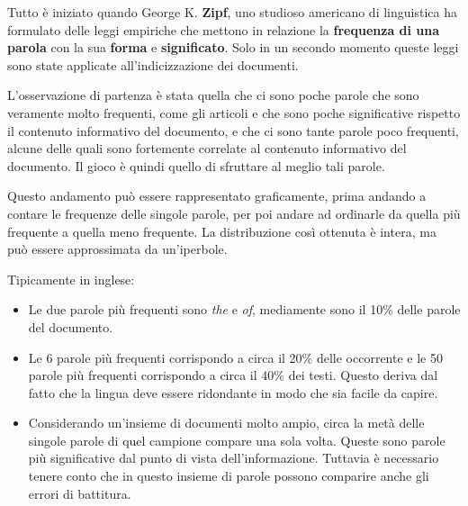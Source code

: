 


Tutto è iniziato quando George K. \textbf{Zipf}, uno studioso americano di linguistica ha formulato delle leggi empiriche che mettono in relazione la \textbf{frequenza di una parola} con la sua \textbf{forma} e \textbf{significato}. 
Solo in un secondo momento queste leggi sono state applicate all'indicizzazione dei documenti.

L'osservazione di partenza è stata quella che ci sono poche parole che sono veramente molto frequenti, come gli articoli e che sono poche significative rispetto il contenuto informativo del documento, e che ci sono tante parole poco frequenti, alcune delle quali sono fortemente correlate al contenuto informativo del documento. Il gioco è quindi quello di sfruttare al meglio tali parole.

Questo andamento può essere rappresentato graficamente, prima andando a contare le frequenze delle singole parole, per poi andare ad ordinarle da quella più frequente a quella meno frequente. La distribuzione così ottenuta è intera, ma può essere approssimata da un'iperbole.

Tipicamente in inglese:
\begin{itemize}
	\item Le due parole più frequenti sono \textit{the} e \textit{of}, mediamente sono il 10\% delle parole del documento.
	\item Le 6 parole più frequenti corrispondo a circa il 20\% delle occorrente e le 50 parole più frequenti corrispondo a circa il 40\% dei testi. Questo deriva dal fatto che la lingua deve essere ridondante in modo che sia facile da capire.
	\item Considerando un'insieme di documenti molto ampio, circa la metà delle singole parole di quel campione compare una sola volta. Queste sono parole più significative dal punto di vista dell'informazione. Tuttavia è necessario tenere conto che in questo insieme di parole possono comparire anche gli errori di battitura.
\end{itemize}

